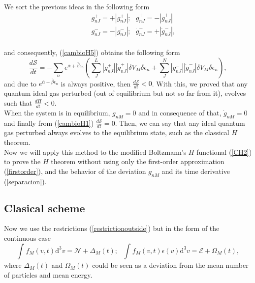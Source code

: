 \documentclass{article}
\newcommand{\de}{\delta}
\newcommand{\Ss}{\mathcal{S}}
\begin{document}
We sort the previous ideas in the following form
\begin{eqnarray}
   &&g^{+}_{nJ}=+|g^{+}_{nJ}|; \ \ \  \dot{g}^{+}_{nJ}=-|\dot{g}^{+}_{nJ}| \nonumber \\
   &&g^{-}_{nJ}=-|g^{-}_{nJ}|; \ \ \ \dot{g}^{-}_{nJ}=+|\dot{g}^{-}_{nJ}| \label{separacion},
\end{eqnarray}{}
\\
and consequently, (\ref{cambioH5}) obtains the following form
\begin{equation}
    \frac{d\Ss}{dt}=-\sum_n  e^{\bar{\alpha}+\bar{\beta}\epsilon_n}\left(\sum_J ^{L} |g^{+}_{nJ}||\dot{g}^{+}_{nJ}|\de V_M \delta \epsilon_n+\sum^{N}_J  |g^{-}_{nJ}||\dot{g}^{-}_{nJ}| \de V_M \delta \epsilon_n \right), \label{cambioH6}
\end{equation}{}
and due to $e^{\bar{\alpha}+\bar{\beta}\epsilon_n}$ is always positive, then $\frac{d\Ss}{dt}<0$. With this, we proved that any quantum ideal gas perturbed (out of equilibrium but not so far from it), evolves such that $\frac{dH}{dt}<0$.\\
When the system is in equilibrium, $g_{nM}=0$ and in consequence of that, $\dot g_{nM}=0$ and finally from (\ref{cambioH1}) $\frac{d\Ss}{dt}=0$. Then, we can say that any ideal quantum gas perturbed always evolves to the equilibrium state, such as the classical $H$ theorem. \\
Now we will apply this method to the modified Boltzmann's $H$ functional (\ref{CH2}) to prove the $H$ theorem without using only the first-order approximation (\ref{firstorder}), and the behavior of the deviation $g_{nM}$ and its time derivative (\ref{separacion}).



\subsection{Clasical scheme}
Now we use the restrictions (\ref{restrictionoutside}) but in the form of the continuous case
\begin{equation}
    \int_{}^{}f_M(v,t)\mathrm{d}^3v=\mathcal{N}+\Delta_M(t); \ \ \ \int_{}^{}f_M(v,t)\epsilon(v)\mathrm{d}^3v=\mathcal{E}+\Omega_M(t)\label{restriccionescambio},
\end{equation}{}
where $\Delta_M(t)$ and $\Omega_M(t)$ could be seen as a deviation from the mean number of particles and mean energy.
\end{document}
